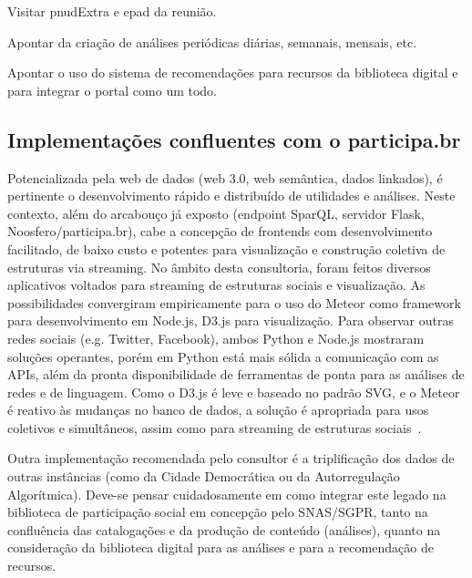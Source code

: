\documentclass[12pt]{article}
\begin{document}
Visitar pnudExtra e epad da reunião.

Apontar da criação de análises periódicas diárias, semanais, mensais, etc.

Apontar o uso do sistema de recomendações para recursos da biblioteca digital e para integrar o portal como um todo.

\subsection{Implementações confluentes com o participa.br}
Potencializada pela web de dados (web 3.0, web semântica, dados linkados),
é pertinente o desenvolvimento rápido e distribuído de utilidades e análises. Neste contexto, além do arcabouço já exposto (endpoint SparQL, servidor Flask, Noosfero/participa.br), cabe a concepção de frontends com desenvolvimento facilitado, de baixo custo e potentes para visualização e construção coletiva de estruturas via streaming. No âmbito desta consultoria, foram feitos diversos aplicativos voltados para streaming de estruturas sociais e visualização. As possibilidades convergiram empiricamente para o uso do Meteor como framework para desenvolvimento em Node.js, D3.js para visualização. Para observar outras redes sociais (e.g. Twitter, Facebook), ambos Python e Node.js mostraram soluções operantes, porém em Python está mais sólida a comunicação com as APIs, além da pronta disponibilidade de ferramentas de ponta para as análises de redes e de linguagem. Como o D3.js é leve e baseado no padrão SVG, e o Meteor é reativo às mudanças no banco de dados, a solução é apropriada para usos coletivos e simultâneos, assim como para streaming de estruturas sociais~\cite{teloes,oscs,mm,mmissa}.

Outra implementação recomendada pelo consultor é a triplificação dos dados de outras instâncias (como da Cidade Democrática ou da Autorregulação Algorítmica). Deve-se pensar cuidadosamente em como integrar este legado na biblioteca de participação social em concepção pelo SNAS/SGPR, tanto na confluência das catalogações e da produção de conteúdo (análises), quanto na consideração da biblioteca digital para as análises e para a recomendação de recursos.
\end{document}

